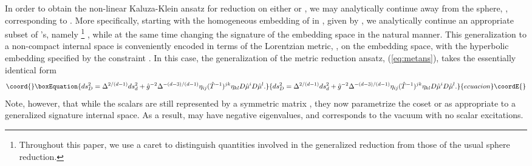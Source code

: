 \documentclass[a4paper,12pt]{article}
\begin{document}
In order to obtain the non-linear Kaluza-Klein ansatz for reduction on
either \coordHE{} or \coordHE{}, we may analytically
continue away from the sphere, \coordHE{}, corresponding to \coordHE{}.
More specifically, starting with the homogeneous embedding of \coordHE{} in
\coordHE{}, given by \coordHE{}, we
analytically continue an appropriate subset of \coordHE{}'s, namely%
%
\footnote{Throughout this paper, we use a caret to distinguish quantities
involved in the generalized reduction from those of the usual sphere
reduction.}
%
\coordHE{}, while at the same time changing the signature of
the embedding space in the natural manner.  This generalization to a
non-compact internal space is conveniently encoded in terms of the
Lorentzian metric, \coordHE{}, on the embedding space, with the
hyperbolic embedding specified by the constraint
\coordHE{}.  In this case, the generalization of
the metric reduction ansatz, (\ref{eq:metans}), takes the essentially
identical form
%
\begin{equation}\coord{}\boxEquation{
ds_D^2=\Delta^{2/(d-1)}ds_d^2+\hat g^{-2}\Delta^{-(d-3)/(d-1)}
\eta_{ij}(\hat T^{-1})^{jk}\eta_{kl} D\hat\mu^iD\hat\mu^l.
\label{eq:hatmetans}
}{
ds_D^2=\Delta^{2/(d-1)}ds_d^2+\hat g^{-2}\Delta^{-(d-3)/(d-1)}
\eta_{ij}(\hat T^{-1})^{jk}\eta_{kl} D\hat\mu^iD\hat\mu^l.
}{ecuacion}\coordE{}\end{equation}
%
Note, however, that while the scalars are still represented by a
symmetric matrix \coordHE{}, they now parametrize the coset
\coordHE{} or \coordHE{} as appropriate to a
generalized signature internal space.  As a result, \coordHE{} may
have negative eigenvalues, and \coordHE{} corresponds to
the vacuum with no scalar excitations.  
\end{document}
